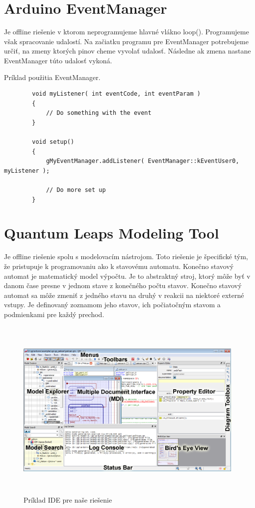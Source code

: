 \section{Arduino EventManager}
Je offline riešenie v ktorom neprogramujeme hlavné vlákno loop(). Programujeme však spracovanie udalostí. Na začiatku programu pre EventManager potrebujeme určiť, na zmeny ktorých pinov cheme vyvolať udalosť. Následne ak zmena nastane EventManager túto udalosť vykoná.

\begin{algorithm}[H]
	\caption{Príklad použitia EventManager.}\label{alg-euclid}
	\begin{verbatim}
		void myListener( int eventCode, int eventParam )
		{
			// Do something with the event
		}

		void setup()
		{
			gMyEventManager.addListener( EventManager::kEventUser0, myListener );

			// Do more set up
		}
	\end{verbatim}
\end{algorithm}


\section{Quantum Leaps Modeling Tool}
Je offline riešenie spolu s modelovacím nástrojom. Toto riešenie je špecifické tým, že pristupuje k programovaniu ako k stavovému automatu. Konečno stavový automat je matematický model výpočtu. Je to abstraktný stroj, ktorý môže byť v danom čase presne v jednom stave z konečného počtu stavov. Konečno stavový automat sa môže zmeniť z jedného stavu na druhý v reakcii na niektoré externé vstupy. Je definovaný zoznamom jeho stavov, ich počiatočným stavom a podmienkami pre každý prechod.

\begin{figure}[H]
	\begin{center}
		\includegraphics[height=9cm]{pics/qm.png}
		\caption{Príklad IDE pre naše riešenie}
	\end{center}
\end{figure}

